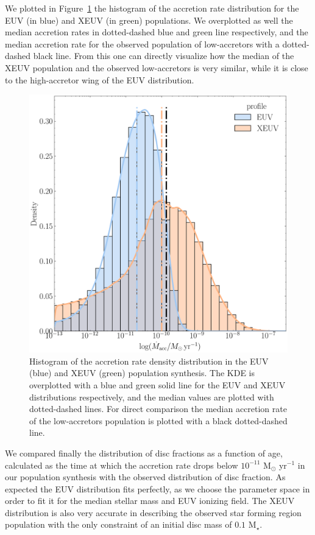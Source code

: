 \documentclass[fleqn,usenatbib,letters]{mnras}
\begin{document}
We plotted in Figure~\ref{fig:hist_mdot} the histogram of the accretion rate distribution for the EUV (in blue) and XEUV (in green) populations. We overplotted as well the median accretion rates in dotted-dashed blue and green line respectively, and the median accretion rate for the observed population of low-accretors with a dotted-dashed black line. From this one can directly visualize how the median of the XEUV population and the observed low-accretors is very similar, while it is close to the high-accretor wing of the EUV distribution.
\begin{figure}
    \includegraphics[width=\columnwidth]{Fig7}
    \caption{Histogram of the accretion rate density distribution in the EUV (blue) and XEUV (green) population synthesis. The KDE is overplotted with a blue and green solid line for the EUV and XEUV distributions respectively, and the median values are plotted with dotted-dashed lines. For direct comparison the median accretion rate of the low-accretors population is plotted with a black dotted-dashed line.\label{fig:hist_mdot}}
\end{figure}

We compared finally the distribution of disc fractions as a function of age, calculated as the time at which the accretion rate drops below $10^{-11}$ M$_\odot$ yr$^{-1}$ in our population synthesis with the observed distribution of disc fraction. As expected the EUV distribution fits perfectly, as we choose the parameter space in order to fit it for the median stellar mass and EUV ionizing field. The XEUV distribution is also very accurate in describing the observed star forming region population with the only constraint of an initial disc mass of $0.1$ M$_\star$.
\end{document}
